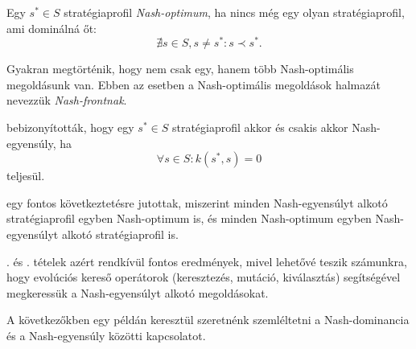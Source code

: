 \begin{ert}
  Egy $s^* \in S$ stratégiaprofil \emph{Nash-optimum}, ha nincs még egy olyan stratégiaprofil, ami dominálná őt:
  \[
    \nexists s \in S, s \neq s^* \colon s \prec s^*.
  \]
\end{ert}


\begin{ert}
  Gyakran megtörténik, hogy nem csak egy, hanem több Nash-optimális megoldásunk van.
  Ebben az esetben a Nash-optimális megoldások halmazát nevezzük \emph{Nash-frontnak}.
\end{ert}


\begin{tet}\label{thm:PROFIL_NE_DOMINANCIAVAL}
   bebizonyították, hogy egy $s^* \in S$ stratégiaprofil akkor és csakis akkor Nash-egyensúly, ha
  \[
    \forall s \in S \colon k(s^*, s) = 0
  \]
  teljesül.
\end{tet}

\begin{tet}\label{thm:NE_EGYENLO_NF}
   egy fontos következtetésre jutottak, miszerint minden Nash-egyensúlyt alkotó stratégiaprofil egyben Nash-optimum is, és minden Nash-optimum egyben Nash-egyensúlyt alkotó stratégiaprofil is.
\end{tet}

\begin{meg}
  . és . tételek azért rendkívül fontos eredmények, mivel lehetővé teszik számunkra, hogy evolúciós kereső operátorok (keresztezés, mutáció, kiválasztás) segítségével megkeressük a Nash-egyensúlyt alkotó megoldásokat.
\end{meg}


A következőkben egy példán keresztül szeretnénk szemléltetni a Nash-dominancia és a Nash-egyensúly közötti kapcsolatot.

